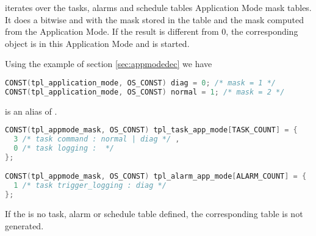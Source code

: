  iterates over the tasks, alarms and schedule tables Application Mode mask tables. It does a bitwise and with the mask stored in the table and the mask computed from the Application Mode. If the result is different from 0, the corresponding object is   in this Application Mode and is started.

Using the example of section \ref{sec:appmodedec} we have

\begin{lstlisting}[language=C]
CONST(tpl_application_mode, OS_CONST) diag = 0; /* mask = 1 */
CONST(tpl_application_mode, OS_CONST) normal = 1; /* mask = 2 */
\end{lstlisting}

 is an alias of . 

\begin{lstlisting}[language=C]
CONST(tpl_appmode_mask, OS_CONST) tpl_task_app_mode[TASK_COUNT] = {
  3 /* task command : normal | diag */ ,
  0 /* task logging :  */ 
};

CONST(tpl_appmode_mask, OS_CONST) tpl_alarm_app_mode[ALARM_COUNT] = {
  1 /* task trigger_logging : diag */ 
};
\end{lstlisting}

If the is no task, alarm or schedule table defined, the corresponding table is not generated.
